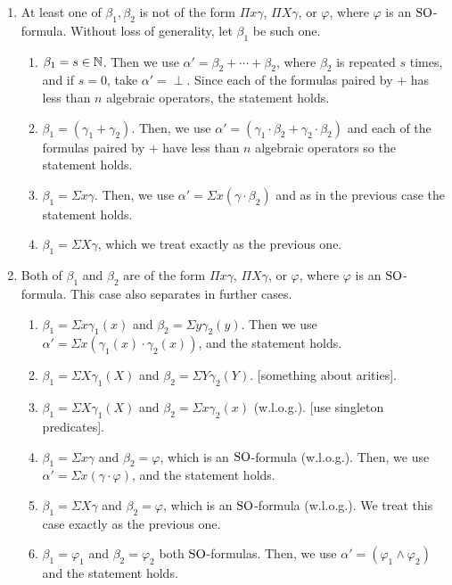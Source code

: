 \begin{enumerate}
	\item At least one of $\beta_1, \beta_2$ is not of the form $\Pi x \gamma$, $\Pi X \gamma$, or $\varphi$, where $\varphi$ is an ${\rm SO}$-formula. Without loss of generality, let $\beta_1$ be such one.
	\begin{enumerate}
		\item $\beta_1 = s \in \mathbb{N}$. Then we use $\alpha' = \beta_2 + \cdots + \beta_2$, where $\beta_2$ is repeated $s$ times, and if $s = 0$, take $\alpha' = \perp$. Since each of the formulas paired by $+$ has less than $n$ algebraic operators, the statement holds.
		\item $\beta_1 = (\gamma_1 + \gamma_2)$. Then, we use $\alpha' = (\gamma_1\cdot\beta_2 + \gamma_2\cdot\beta_2)$ and each of the formulas paired by $+$ have less than $n$ algebraic operators so the statement holds.
		\item $\beta_1 = \Sigma x \gamma$. Then, we use $\alpha' = \Sigma x (\gamma\cdot\beta_2)$ and as in the previous case the statement holds.
		\item $\beta_1 = \Sigma X \gamma$, which we treat exactly as the previous one.
	\end{enumerate}
	\item Both of $\beta_1$ and $\beta_2$ are of the form $\Pi x \gamma$, $\Pi X \gamma$, or $\varphi$, where $\varphi$ is an ${\rm SO}$-formula. This case also separates in further cases.
	\begin{enumerate}
		\item $\beta_1 = \Sigma x \gamma_1(x)$ and $\beta_2 = \Sigma y \gamma_2(y)$. Then we use $\alpha' = \Sigma x(\gamma_1(x)\cdot\gamma_2(x))$, and the statement holds.
		\item $\beta_1 = \Sigma X \gamma_1(X)$ and $\beta_2 = \Sigma Y \gamma_2(Y)$. [something about arities].
		\item $\beta_1 = \Sigma X \gamma_1(X)$ and $\beta_2 = \Sigma x \gamma_2(x)$ (w.l.o.g.). [use singleton predicates].
		\item $\beta_1 = \Sigma x \gamma$ and $\beta_2 = \varphi$, which is an ${\rm SO}$-formula (w.l.o.g.). Then, we use $\alpha' = \Sigma x (\gamma \cdot \varphi)$, and the statement holds.
		\item $\beta_1 = \Sigma X \gamma$ and $\beta_2 = \varphi$, which is an ${\rm SO}$-formula (w.l.o.g.). We treat this case exactly as the previous one.
		\item $\beta_1 = \varphi_1$ and $\beta_2 = \varphi_2$ both ${\rm SO}$-formulas. Then, we use $\alpha' = (\varphi_1 \wedge \varphi_2)$ and the statement holds.
	\end{enumerate}
\end{enumerate}


